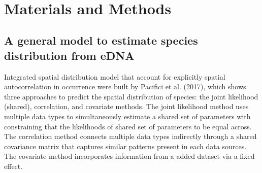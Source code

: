 \documentclass[12pt]{article}
\begin{document}
\begin{linenumbers}
\ \\

\section{Materials and Methods}


\subsection{A general model to estimate species distribution from eDNA}
Integrated spatial distribution model that account for explicitly spatial autocorrelation in occurrence were built by Pacifici et al. (2017), which shows three approaches to predict the spatial distribution of species: the joint likelihood (shared), correlation, and covariate methods. The joint likelihood method uses multiple data types to simultaneously estimate a shared set of parameters with constraining that the likelihoods of shared set of parameters to be equal across. The correlation method connects multiple data types indirectly through a shared covariance matrix that captures similar patterns present in each data sources. The covariate method incorporates information from a added dataset via a fixed effect. 


\end{linenumbers}
\end{document}

